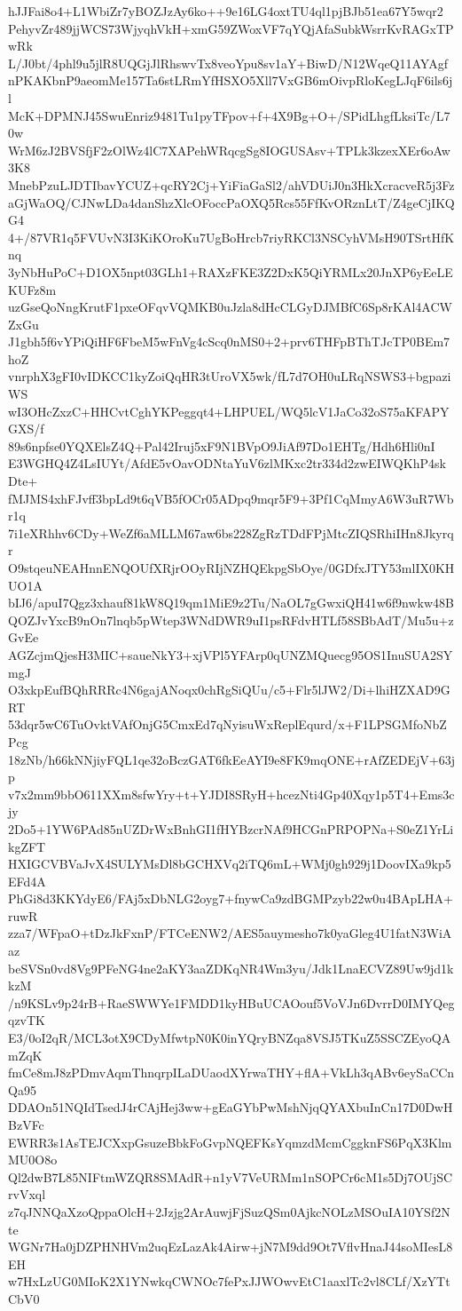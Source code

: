 hJJFai8o4+L1WbiZr7yBOZJzAy6ko++9e16LG4oxtTU4ql1pjBJb51ea67Y5wqr2
PehyvZr489jjWCS73WjyqhVkH+xmG59ZWoxVF7qYQjAfaSubkWsrrKvRAGxTPwRk
L/J0bt/4phl9u5jlR8UQGjJlRhswvTx8veoYpu8sv1aY+BiwD/N12WqeQ11AYAgf
nPKAKbnP9aeomMe157Ta6stLRmYfHSXO5Xll7VxGB6mOivpRloKegLJqF6ils6jl
McK+DPMNJ45SwuEnriz9481Tu1pyTFpov+f+4X9Bg+O+/SPidLhgfLksiTc/L70w
WrM6zJ2BVSfjF2zOlWz4lC7XAPehWRqcgSg8IOGUSAsv+TPLk3kzexXEr6oAw3K8
MnebPzuLJDTIbavYCUZ+qcRY2Cj+YiFiaGaSl2/ahVDUiJ0n3HkXcracveR5j3Fz
aGjWaOQ/CJNwLDa4danShzXlcOFoccPaOXQ5Rcs55FfKvORznLtT/Z4geCjIKQG4
4+/87VR1q5FVUvN3I3KiKOroKu7UgBoHrcb7riyRKCl3NSCyhVMsH90TSrtHfKnq
3yNbHuPoC+D1OX5npt03GLh1+RAXzFKE3Z2DxK5QiYRMLx20JnXP6yEeLEKUFz8m
uzGseQoNngKrutF1pxeOFqvVQMKB0uJzla8dHcCLGyDJMBfC6Sp8rKAl4ACWZxGu
J1gbh5f6vYPiQiHF6FbeM5wFnVg4cScq0nMS0+2+prv6THFpBThTJcTP0BEm7hoZ
vnrphX3gFI0vIDKCC1kyZoiQqHR3tUroVX5wk/fL7d7OH0uLRqNSWS3+bgpaziWS
wI3OHcZxzC+HHCvtCghYKPeggqt4+LHPUEL/WQ5lcV1JaCo32oS75aKFAPYGXS/f
89s6npfse0YQXElsZ4Q+Pal42Iruj5xF9N1BVpO9JiAf97Do1EHTg/Hdh6Hli0nI
E3WGHQ4Z4LsIUYt/AfdE5vOavODNtaYuV6zlMKxc2tr334d2zwEIWQKhP4skDte+
fMJMS4xhFJvff3bpLd9t6qVB5fOCr05ADpq9mqr5F9+3Pf1CqMmyA6W3uR7Wbr1q
7i1eXRhhv6CDy+WeZf6aMLLM67aw6bs228ZgRzTDdFPjMtcZIQSRhiIHn8Jkyrqr
O9stqeuNEAHnnENQOUfXRjrOOyRIjNZHQEkpgSbOye/0GDfxJTY53mlIX0KHUO1A
bIJ6/apuI7Qgz3xhauf81kW8Q19qm1MiE9z2Tu/NaOL7gGwxiQH41w6f9nwkw48B
QOZJvYxcB9nOn7lnqb5pWtep3WNdDWR9uI1psRFdvHTLf58SBbAdT/Mu5u+zGvEe
AGZcjmQjesH3MIC+saueNkY3+xjVPl5YFArp0qUNZMQuecg95OS1InuSUA2SYmgJ
O3xkpEufBQhRRRc4N6gajANoqx0chRgSiQUu/c5+Flr5lJW2/Di+lhiHZXAD9GRT
53dqr5wC6TuOvktVAfOnjG5CmxEd7qNyisuWxReplEqurd/x+F1LPSGMfoNbZPcg
18zNb/h66kNNjiyFQL1qe32oBczGAT6fkEeAYI9e8FK9mqONE+rAfZEDEjV+63jp
v7x2mm9bbO611XXm8sfwYry+t+YJDI8SRyH+hcezNti4Gp40Xqy1p5T4+Ems3cjy
2Do5+1YW6PAd85nUZDrWxBnhGI1fHYBzcrNAf9HCGnPRPOPNa+S0eZ1YrLikgZFT
HXIGCVBVaJvX4SULYMsDl8bGCHXVq2iTQ6mL+WMj0gh929j1DoovIXa9kp5EFd4A
PhGi8d3KKYdyE6/FAj5xDbNLG2oyg7+fnywCa9zdBGMPzyb22w0u4BApLHA+ruwR
zza7/WFpaO+tDzJkFxnP/FTCeENW2/AES5auymesho7k0yaGleg4U1fatN3WiAaz
beSVSn0vd8Vg9PFeNG4ne2aKY3aaZDKqNR4Wm3yu/Jdk1LnaECVZ89Uw9jd1kkzM
/n9KSLv9p24rB+RaeSWWYe1FMDD1kyHBuUCAOouf5VoVJn6DvrrD0IMYQegqzvTK
E3/0oI2qR/MCL3otX9CDyMfwtpN0K0inYQryBNZqa8VSJ5TKuZ5SSCZEyoQAmZqK
fmCe8mJ8zPDmvAqmThnqrpILaDUaodXYrwaTHY+flA+VkLh3qABv6eySaCCnQa95
DDAOn51NQIdTsedJ4rCAjHej3ww+gEaGYbPwMshNjqQYAXbuInCn17D0DwHBzVFc
EWRR3s1AsTEJCXxpGsuzeBbkFoGvpNQEFKsYqmzdMcmCggknFS6PqX3KlmMU0O8o
Ql2dwB7L85NIFtmWZQR8SMAdR+n1yV7VeURMm1nSOPCr6cM1s5Dj7OUjSCrvVxql
z7qJNNQaXzoQppaOlcH+2Jzjg2ArAuwjFjSuzQSm0AjkcNOLzMSOuIA10YSf2Nte
WGNr7Ha0jDZPHNHVm2uqEzLazAk4Airw+jN7M9dd9Ot7VflvHnaJ44soMIesL8EH
w7HxLzUG0MIoK2X1YNwkqCWNOc7fePxJJWOwvEtC1aaxlTc2vl8CLf/XzYTtCbV0
